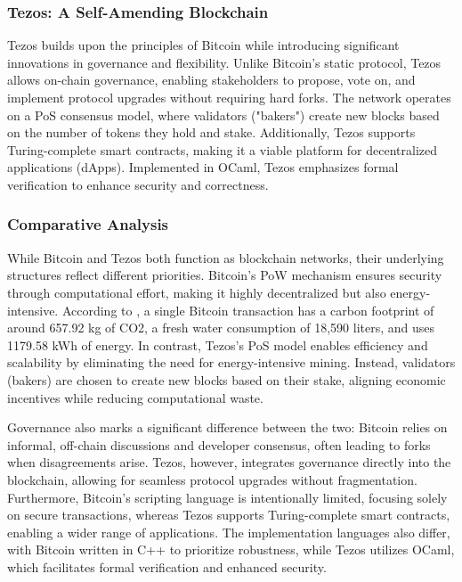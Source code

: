 \subsubsection{Tezos: A Self-Amending Blockchain}

Tezos builds upon the principles of Bitcoin while introducing significant innovations in governance and flexibility. Unlike Bitcoin’s static protocol, Tezos allows on-chain governance, enabling stakeholders to propose, vote on, and implement protocol upgrades without requiring hard forks. The network operates on a PoS consensus model, where validators ("bakers") create new blocks based on the number of tokens they hold and stake. Additionally, Tezos supports Turing-complete smart contracts, making it a viable platform for decentralized applications (dApps). Implemented in OCaml, Tezos emphasizes formal verification to enhance security and correctness.

\subsubsection{Comparative Analysis}


While Bitcoin and Tezos both function as blockchain networks, their underlying structures reflect different priorities. Bitcoin’s PoW mechanism ensures security through computational effort, making it highly decentralized but also energy-intensive. According to \autocite{digiconomist}, a single Bitcoin transaction has a carbon footprint of around 657.92 kg of CO2, a fresh water consumption of 18,590 liters, and uses 1179.58 kWh of energy. In contrast, Tezos’s PoS model enables efficiency and scalability by eliminating the need for energy-intensive mining. Instead, validators (bakers) are chosen to create new blocks based on their stake, aligning economic incentives while reducing computational waste.

Governance also marks a significant difference between the two: Bitcoin relies on informal, off-chain discussions and developer consensus, often leading to forks when disagreements arise. Tezos, however, integrates governance directly into the blockchain, allowing for seamless protocol upgrades without fragmentation. Furthermore, Bitcoin’s scripting language is intentionally limited, focusing solely on secure transactions, whereas Tezos supports Turing-complete smart contracts, enabling a wider range of applications. The implementation languages also differ, with Bitcoin written in C++ to prioritize robustness, while Tezos utilizes OCaml, which facilitates formal verification and enhanced security.

